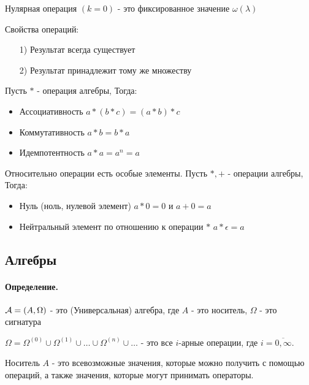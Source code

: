 \documentclass{report}
\begin{document}
Нулярная операция $(k = 0)$ - это фиксированное значение $\omega(\lambda)$

\medskip

Свойства операций:
\begin{itemize}
    \item[1)] Результат всегда существует
    \item[2)] Результат принадлежит тому же множеству
\end{itemize}

\medskip

Пусть $*$ - операция алгебры, Тогда:
\begin{itemize}
    \item Ассоциативность\newline
          $a * (b * c) = (a * b) * c$
    \item Коммутативность\newline
          $a*b = b*a$
    \item Идемпотентность\newline
          $a*a = a^{n} = a$
\end{itemize}

Относительно операции есть особые элементы. Пусть $*, +$ - операции алгебры, Тогда:
\begin{itemize}
    \item Нуль (ноль, нулевой элемент)\newline
          $a*0 = 0$ и $a+0=a$
    \item Нейтральный элемент по отношению к операции $*$\newline
          $a*\epsilon = a$
\end{itemize}

\subsection{Алгебры}
\paragraph*{Определение.}
${\cal A} = (A, \Omega)$ - это (Универсальная) алгебра, где $A$ - это носитель, $\Omega$ - это сигнатура

$\Omega = \Omega^{(0)} \cup \Omega^{(1)} \cup \ldots \cup \Omega^{(n)} \cup \ldots$
- это все $i$-арные операции, где $i = \overline{0,\infty}$.

\medskip

Носитель $A$ - это всевозможные значения, которые можно получить с помощью операций,
а также значения, которые могут принимать операторы.
\end{document}
